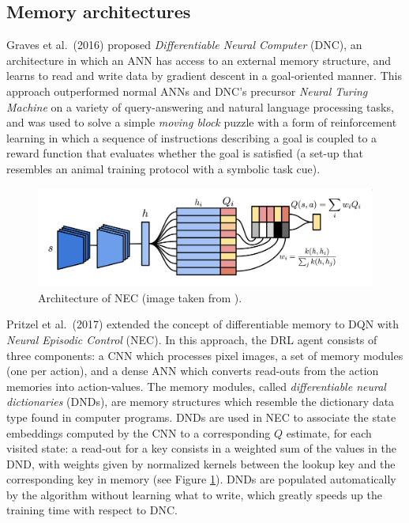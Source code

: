 \subsection{Memory architectures} \label{s:memory}
Graves et al.\ (2016) \cite{graves2016hybrid} proposed \textit{Differentiable 
Neural Computer} (DNC), an architecture in which an ANN has access to an 
external memory structure, and learns to read and write data by gradient descent
in a goal-oriented manner.
This approach outperformed normal ANNs and DNC's precursor \textit{Neural 
Turing Machine} \cite{gravesneural} on a variety of query-answering and natural 
language processing tasks, and was used to solve a simple \textit{moving block} 
puzzle with a form of reinforcement learning in which a sequence of instructions
describing a goal is coupled to a reward function that evaluates whether the 
goal is satisfied (a set-up that resembles an animal training protocol with a 
symbolic task cue).
%
\begin{figure}
\includegraphics[width=\textwidth]{pictures/nec}
\centering
\caption[Architecture of NEC]{Architecture of NEC (image taken from 
			      \cite{pritzel2017neural}).}
\label{f:nec}
\end{figure}
%

Pritzel et al.\ (2017) \cite{pritzel2017neural} extended the concept of 
differentiable memory to DQN with \textit{Neural Episodic Control} (NEC). 
In this approach, the DRL agent consists of three components: a CNN which 
processes pixel images, a set of memory modules (one per action), and a dense 
ANN which converts read-outs from the action memories into action-values. The 
memory modules, called \textit{differentiable neural dictionaries} (DNDs), are 
memory structures which resemble the dictionary data type found in computer 
programs. DNDs are used in NEC to associate the state embeddings computed by the
CNN to a corresponding $Q$ estimate, for each visited state: a read-out for a 
key consists in a weighted sum of the values in the DND, with weights given by 
normalized kernels between the lookup key and the corresponding key in memory 
(see Figure \ref{f:nec}). 
DNDs are populated automatically by the algorithm without learning what to write,
which greatly speeds up the training time with respect to DNC.

